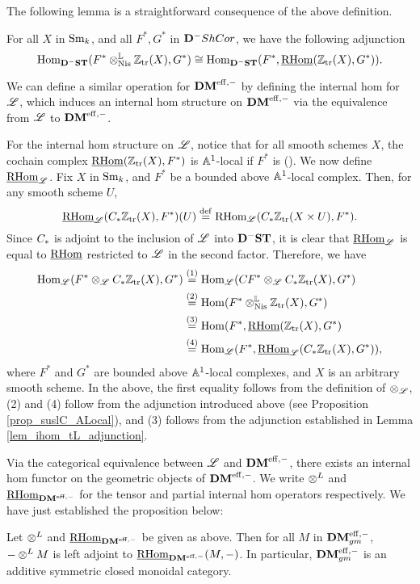 The following lemma is a straightforward consequence of the above 
definition.

\begin{lem}\label{lem_ihom_tL_adjunction}
For all $X$ in $\Sm$, and all $F^*, G^*$ in $\DCat^-\ShCor$, we 
have the following adjunction
\[
\hom_{\DShCor}(F^*\tLNis \Ztr(X), G^*) \cong
\hom_{\DShCor}(F^*, \sheaf{\rhom}(\Ztr(X), G^*)).
\]
\end{lem}

We can define a similar operation for $\DMeff$ by
defining the internal hom for $\ALocal$, which induces an internal
hom structure on $\DMeff$ via the equivalence from $\ALocal$ to
$\DMeff$.

For the internal hom structure on $\ALocal$, notice that for all
smooth schemes $X$, the cochain complex $\sheaf{\rhom}(\Ztr(X), F^*)$ is $\A^1$-local if 
$F^*$ is (\cite[14.12]{MVW}). We now define $\ihomAL$. Fix $X$ in
$\Sm$, and $F^*$ be a bounded above $\A^1$-local complex. Then, for
any smooth scheme $U$,
\[
\ihomAL(\suslC \Ztr(X), F^*)(U) \defeq \rhom_{\ALocal}(\suslC 
   \Ztr(X \times U), F^*).
\]
Since $\suslC$ is adjoint to the inclusion of $\ALocal$ into 
$\DShCor$, it is clear that $\ihomAL$ is equal to $\sheaf{\rhom}$
restricted to $\ALocal$ in the second factor. Therefore, we have
\begin{align*}
\hom_{\ALocal}(F^* \tAL \suslC \Ztr(X), G^*) &\stackrel{(1)}{=}
\hom_{\ALocal}(\suslC[] F^* \tAL \suslC \Ztr(X), G^*) \\ 
&\stackrel{(2)}{=} \hom(F^* \tLNis \Ztr(X), G^*) \\
&\stackrel{(3)}{=} \hom(F^*, \sheaf{\rhom}(\Ztr(X), G^*) \\
&\stackrel{(4)}{=} \hom_{\ALocal}(F^*, \ihomAL(\suslC \Ztr(X), G^*)),
\end{align*}
where $F^*$ and $G^*$ are bounded above $\A^1$-local complexes,
and $X$ is an arbitrary smooth scheme. In the above, the first 
equality follows from the definition of $\tAL$, (2) and (4) 
follow from the adjunction introduced above (see Proposition
\ref{prop_suslC_ALocal}), and (3) follows from the adjunction
established in Lemma \ref{lem_ihom_tL_adjunction}. 

Via the categorical equivalence between $\ALocal$ and $\DMeff$,
there exists an internal hom functor on the geometric objects
of $\DMeff$. We write $\tDM$ and $\ihomDMf$ for the tensor and
partial internal hom operators respectively. We have just
established the proposition below:

\begin{prop}\label{prop_DMgm_monoidal}
Let $\tDM$ and $\ihomDMf$ be given as above. Then for all
$M$ in $\DMeffgm$, $- \tDM M$ is left adjoint to $\ihomDMf(M, -)$.
In particular, $\DMeffgm$ is an additive symmetric closed monoidal 
category.
\end{prop}

